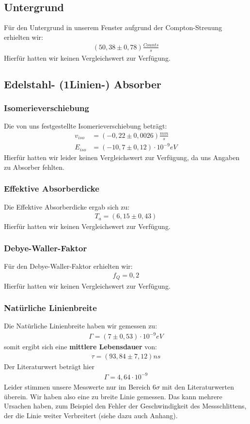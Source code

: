\documentclass[12pt]{article}
\begin{document}
\subsection*{Untergrund}
Für den Untergrund in unserem Fenster aufgrund der Compton-Streuung erhielten wir:
\begin{align*}
 (50,38 \pm 0,78) \frac{Counts}{s}
\end{align*}
Hierfür hatten wir keinen Vergleichswert zur Verfügung.

\subsection*{Edelstahl- (1Linien-) Absorber}
\subsubsection*{Isomerieverschiebung}
Die von uns festgestellte Isomerieverschiebung beträgt:
\begin{align*}
 v_{iso} &= ( -0,22 \pm 0,0026) \frac{mm}{s} \\
 E_{iso} &= ( -10,7 \pm 0,12 ) \cdot 10^{-9} eV
\end{align*}
Hierfür hatten wir leider keinen Vergleichswert zur Verfügung, da uns Angaben zu Absorber fehlten.

\subsubsection*{Effektive Absorberdicke}
Die Effektive Absorberdicke ergab sich zu:
\begin{align*}
 T_a = ( 6,15 \pm 0,43 )
\end{align*}
Hierfür hatten wir keinen Vergleichswert zur Verfügung.

\subsubsection*{Debye-Waller-Faktor}
Für den Debye-Waller-Faktor erhielten wir:
\begin{align*}
 f_Q = 0,2
\end{align*}
Hierfür hatten wir keinen Vergleichswert zur Verfügung.

\subsubsection*{Natürliche Linienbreite}
Die Natürliche Linienbreite haben wir gemessen zu:
\begin{align*}
 \Gamma = ( 7 \pm 0,53) \cdot 10^{-9} eV
\end{align*}
somit ergibt sich eine \textbf{mittlere Lebensdauer} von:
\begin{align*}
 \tau = (93,84 \pm 7,12) ns
\end{align*}
Der Literaturwert beträgt hier
\begin{align*}
 \Gamma = 4,64 \cdot 10^{-9} 
\end{align*}
Leider stimmen unsere Messwerte nur im Bereich $6\sigma$ mit den Literaturwerten überein. Wir haben also eine zu breite Linie gemessen. Das kann mehrere Ursachen haben, zum Beispiel den Fehler der Geschwindigkeit des Messschlittens, der die Linie weiter Verbreitert (siehe dazu auch Anhang).
\end{document}
